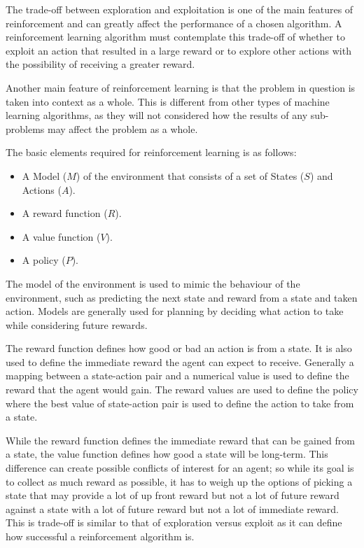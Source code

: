 The trade-off between exploration and exploitation is one of the main features of reinforcement and can greatly affect the performance of a chosen algorithm. A reinforcement learning algorithm must contemplate this trade-off of whether to exploit an action that resulted in a large reward or to explore other actions with the possibility of receiving a greater reward.

Another main feature of reinforcement learning is that the problem in question is taken into context as a whole. This is different from other types of machine learning algorithms, as they will not considered how the results of any sub-problems may affect the problem as a whole.

The basic elements required for reinforcement learning is as follows:
\begin{itemize}
\item A Model ($M$) of the environment that consists of a set of States ($S$) and Actions ($A$).
\item A reward function ($R$).
\item A value function ($V$).
\item A policy ($P$).
\end{itemize}

The model of the environment is used to mimic the behaviour of the environment, such as predicting the next state and reward from a state and taken action. Models are generally used for planning by deciding what action to take while considering future rewards.

The reward function defines how good or bad an action is from a state. It is also used to define the immediate reward the agent can expect to receive. Generally a mapping between a state-action pair and a numerical value is used to define the reward that the agent would gain. The reward values are used to define the policy where the best value of state-action pair is used to define the action to take from a state. 

While the reward function defines the immediate reward that can be gained from a state, the value function defines how good a state will be long-term. This difference can create possible conflicts of interest for an agent; so while its goal is to collect as much reward as possible, it has to weigh up the options of picking a state that may provide a lot of up front reward but not a lot of future reward against a state with a lot of future reward but not a lot of immediate reward. This is trade-off is similar to that of exploration versus exploit as it can define how successful a reinforcement algorithm is.

